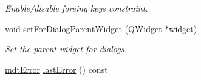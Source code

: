 \begin{DoxyCompactItemize}
\begin{DoxyCompactList}\small\item\em Enable/disable foreing keys constraint. \end{DoxyCompactList}\item 
void \hyperlink{classmdt_sql_database_manager_a3da56635b2a4db98b768e5846e15fa83}{setForDialogParentWidget} (QWidget $\ast$widget)
\begin{DoxyCompactList}\small\item\em Set the parent widget for dialogs. \end{DoxyCompactList}\item 
\hypertarget{classmdt_sql_database_manager_a7fb8458fb9fc10216c8dfbbeb2c3dc50}{
\hyperlink{classmdt_error}{mdtError} \hyperlink{classmdt_sql_database_manager_a7fb8458fb9fc10216c8dfbbeb2c3dc50}{lastError} () const }
\label{classmdt_sql_database_manager_a7fb8458fb9fc10216c8dfbbeb2c3dc50}


\end{DoxyCompactItemize}
